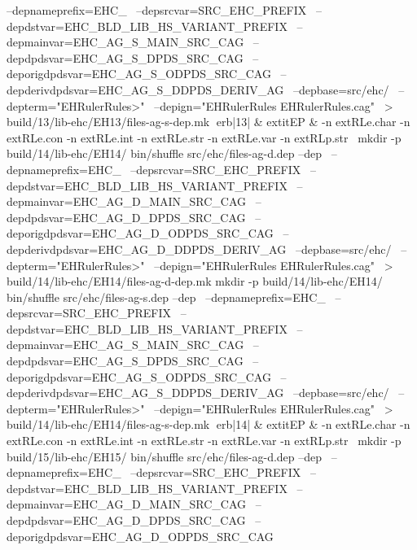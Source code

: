 	  --depnameprefix=EHC_ \
	  --depsrcvar=SRC_EHC_PREFIX \
	  --depdstvar=EHC_BLD_LIB_HS_VARIANT_PREFIX \
	  --depmainvar=EHC_AG_S_MAIN_SRC_CAG \
	  --depdpdsvar=EHC_AG_S_DPDS_SRC_CAG \
	  --deporigdpdsvar=EHC_AG_S_ODPDS_SRC_CAG \
	  --depderivdpdsvar=EHC_AG_S_DDPDS_DERIV_AG \
	  --depbase=src/ehc/ \
	  --depterm="EHRulerRules>" \
	  --depign="EHRulerRules EHRulerRules.cag" \
	    > build/13/lib-ehc/EH13/files-ag-s-dep.mk
erb|13| & 	extit{EP} & 
-n 	extRL{e.char}\hspace{.5em} 
-n 	extRL{e.con}\hspace{.5em} 
-n 	extRL{e.int}\hspace{.5em} 
-n 	extRL{e.str}\hspace{.5em} 
-n 	extRL{e.var}\hspace{.5em} 
-n 	extRL{p.str}\hspace{.5em} 
\
mkdir -p build/14/lib-ehc/EH14/
bin/shuffle src/ehc/files-ag-d.dep --dep \
	  --depnameprefix=EHC_ \
	  --depsrcvar=SRC_EHC_PREFIX \
	  --depdstvar=EHC_BLD_LIB_HS_VARIANT_PREFIX \
	  --depmainvar=EHC_AG_D_MAIN_SRC_CAG \
	  --depdpdsvar=EHC_AG_D_DPDS_SRC_CAG \
	  --deporigdpdsvar=EHC_AG_D_ODPDS_SRC_CAG \
	  --depderivdpdsvar=EHC_AG_D_DDPDS_DERIV_AG \
	  --depbase=src/ehc/ \
	  --depterm="EHRulerRules>" \
	  --depign="EHRulerRules EHRulerRules.cag" \
	    > build/14/lib-ehc/EH14/files-ag-d-dep.mk
mkdir -p build/14/lib-ehc/EH14/
bin/shuffle src/ehc/files-ag-s.dep --dep \
	  --depnameprefix=EHC_ \
	  --depsrcvar=SRC_EHC_PREFIX \
	  --depdstvar=EHC_BLD_LIB_HS_VARIANT_PREFIX \
	  --depmainvar=EHC_AG_S_MAIN_SRC_CAG \
	  --depdpdsvar=EHC_AG_S_DPDS_SRC_CAG \
	  --deporigdpdsvar=EHC_AG_S_ODPDS_SRC_CAG \
	  --depderivdpdsvar=EHC_AG_S_DDPDS_DERIV_AG \
	  --depbase=src/ehc/ \
	  --depterm="EHRulerRules>" \
	  --depign="EHRulerRules EHRulerRules.cag" \
	    > build/14/lib-ehc/EH14/files-ag-s-dep.mk
erb|14| & 	extit{EP} & 
-n 	extRL{e.char}\hspace{.5em} 
-n 	extRL{e.con}\hspace{.5em} 
-n 	extRL{e.int}\hspace{.5em} 
-n 	extRL{e.str}\hspace{.5em} 
-n 	extRL{e.var}\hspace{.5em} 
-n 	extRL{p.str}\hspace{.5em} 
\
mkdir -p build/15/lib-ehc/EH15/
bin/shuffle src/ehc/files-ag-d.dep --dep \
	  --depnameprefix=EHC_ \
	  --depsrcvar=SRC_EHC_PREFIX \
	  --depdstvar=EHC_BLD_LIB_HS_VARIANT_PREFIX \
	  --depmainvar=EHC_AG_D_MAIN_SRC_CAG \
	  --depdpdsvar=EHC_AG_D_DPDS_SRC_CAG \
	  --deporigdpdsvar=EHC_AG_D_ODPDS_SRC_CAG \
